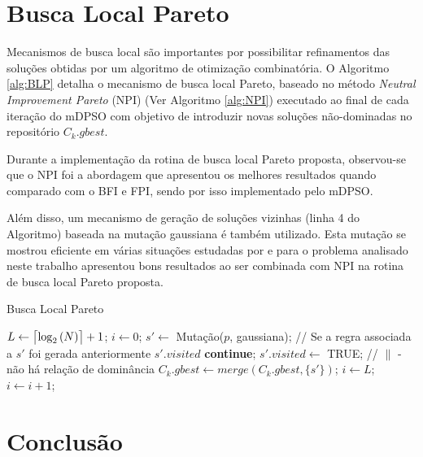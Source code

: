 \documentclass[
	12pt,				%
	openany,			%
	oneside,	
	a4paper,			%
	brazil,				%
	]{unimontes-ppgmsc-abntex2}
\DeclarePairedDelimiter{\ceil}{\lceil}{\rceil}
\begin{document}
\section{Busca Local Pareto}
\label{sec:mdpso_busca_local}

Mecanismos de busca local são importantes por possibilitar refinamentos das soluções obtidas por um algoritmo de otimização combinatória. O Algoritmo \ref{alg:BLP} detalha o mecanismo de busca local Pareto, baseado no método {\em Neutral Improvement Pareto} (NPI) (Ver Algoritmo \ref{alg:NPI}) executado ao final de cada iteração do mDPSO com objetivo de introduzir novas soluções não-dominadas no repositório $C_k.gbest$. 

Durante a implementação da rotina de busca local Pareto proposta, observou-se que o NPI foi a abordagem que apresentou os melhores resultados quando comparado com o BFI e FPI, sendo por isso implementado pelo mDPSO. 

Além disso, um mecanismo de geração de soluções vizinhas (linha 4 do Algoritmo) baseada na mutação gaussiana é também utilizado. Esta mutação se mostrou eficiente em várias situações estudadas por  e para o problema analisado neste trabalho apresentou bons resultados ao ser combinada com NPI na rotina de busca local Pareto proposta.  

\begin{algorithm}[ht]
\caption{Busca Local Pareto}
\label{alg:BLP}
\begin{algorithmic}[1]
\State $L \leftarrow \ceil[\big]{\log_{2}{(N)}} + 1$;
\State $i \leftarrow 0$;
  \State $s' \leftarrow $ Mutação($p$, gaussiana);
  \State // Se a regra associada a $s'$ foi gerada anteriormente $s'.visited$
    \State \textbf{continue};
  \EndIf
  \State $s'.visited \leftarrow$ TRUE;
   // $\parallel$ - \small{não há relação de dominância}
  	\State $C_k.gbest \leftarrow merge(C_k.gbest, \{s'\})$;
    \State $i \leftarrow L$;
  \EndIf
  \State $i \leftarrow i + 1$;
\EndWhile
\end{algorithmic}
\end{algorithm}


\section{Conclusão}
\end{document}

